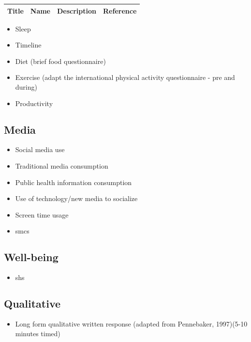\documentclass[]{book}
\providecommand{\tightlist}{%
  \setlength{\itemsep}{0pt}\setlength{\parskip}{0pt}}
\begin{document}
\begin{longtable}[]{@{}llll@{}}
\toprule
Title & Name & Description & Reference\tabularnewline
\midrule
\endhead
\bottomrule
\end{longtable}

\begin{itemize}
\tightlist
\item
  Sleep
\item
  Timeline
\item
  Diet (brief food questionnaire)
\item
  Exercise (adapt the international physical activity questionnaire - pre and during)
\item
  Productivity
\end{itemize}

\hypertarget{media-1}{%
\subsection{Media}\label{media-1}}

\begin{itemize}
\tightlist
\item
  Social media use
\item
  Traditional media consumption
\item
  Public health information consumption
\item
  Use of technology/new media to socialize
\item
  Screen time usage
\item
  smcs
\end{itemize}

\hypertarget{well-being-1}{%
\subsection{Well-being}\label{well-being-1}}

\begin{itemize}
\tightlist
\item
  shs
\end{itemize}

\hypertarget{qualitative-1}{%
\subsection{Qualitative}\label{qualitative-1}}

\begin{itemize}
\tightlist
\item
  Long form qualitative written response (adapted from Pennebaker, 1997)(5-10 minutes timed)
\end{itemize}
\end{document}

